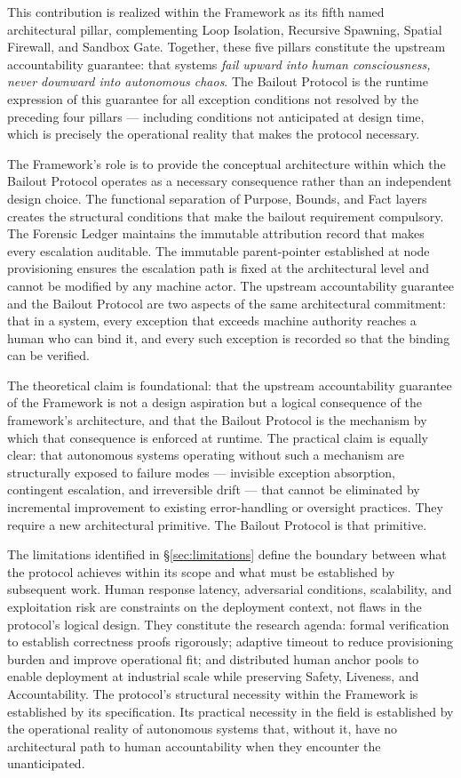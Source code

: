 This contribution is realized within the \bxthree{} Framework as its fifth named architectural pillar, complementing Loop Isolation, Recursive Spawning, Spatial Firewall, and Sandbox Gate. Together, these five pillars constitute the upstream accountability guarantee: that \bxthree{} systems \emph{fail upward into human consciousness, never downward into autonomous chaos}. The Bailout Protocol is the runtime expression of this guarantee for all exception conditions not resolved by the preceding four pillars — including conditions not anticipated at design time, which is precisely the operational reality that makes the protocol necessary.

The \bxthree{} Framework's role is to provide the conceptual architecture within which the Bailout Protocol operates as a necessary consequence rather than an independent design choice. The functional separation of Purpose, Bounds, and Fact layers creates the structural conditions that make the bailout requirement compulsory. The Forensic Ledger maintains the immutable attribution record that makes every escalation auditable. The immutable parent-pointer established at node provisioning ensures the escalation path is fixed at the architectural level and cannot be modified by any machine actor. The upstream accountability guarantee and the Bailout Protocol are two aspects of the same architectural commitment: that in a \bxthree{} system, every exception that exceeds machine authority reaches a human who can bind it, and every such exception is recorded so that the binding can be verified.

The theoretical claim is foundational: that the upstream accountability guarantee of the \bxthree{} Framework is not a design aspiration but a logical consequence of the framework's architecture, and that the Bailout Protocol is the mechanism by which that consequence is enforced at runtime. The practical claim is equally clear: that autonomous systems operating without such a mechanism are structurally exposed to failure modes — invisible exception absorption, contingent escalation, and irreversible drift — that cannot be eliminated by incremental improvement to existing error-handling or oversight practices. They require a new architectural primitive. The Bailout Protocol is that primitive.

The limitations identified in \S\ref{sec:limitations} define the boundary between what the protocol achieves within its scope and what must be established by subsequent work. Human response latency, adversarial conditions, scalability, and exploitation risk are constraints on the deployment context, not flaws in the protocol's logical design. They constitute the research agenda: formal verification to establish correctness proofs rigorously; adaptive timeout to reduce provisioning burden and improve operational fit; and distributed human anchor pools to enable deployment at industrial scale while preserving Safety, Liveness, and Accountability. The protocol's structural necessity within the \bxthree{} Framework is established by its specification. Its practical necessity in the field is established by the operational reality of autonomous systems that, without it, have no architectural path to human accountability when they encounter the unanticipated.
